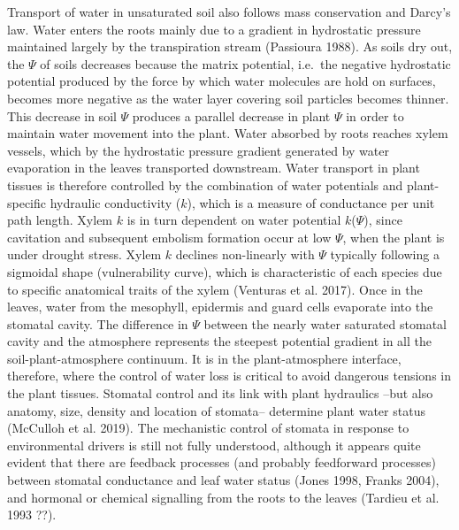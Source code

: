 \documentclass[11pt,twoside]{reedthesis}
\begin{document}
Transport of water in unsaturated soil also follows mass conservation
and Darcy's law. Water enters the roots mainly due to a gradient in
hydrostatic pressure maintained largely by the transpiration stream
(Passioura 1988). As soils dry out, the \(\Psi\) of soils decreases
because the matrix potential, i.e.~the negative hydrostatic potential
produced by the force by which water molecules are hold on surfaces,
becomes more negative as the water layer covering soil particles becomes
thinner. This decrease in soil \(\Psi\) produces a parallel decrease in
plant \(\Psi\) in order to maintain water movement into the plant. Water
absorbed by roots reaches xylem vessels, which by the hydrostatic
pressure gradient generated by water evaporation in the leaves
transported downstream. Water transport in plant tissues is therefore
controlled by the combination of water potentials and plant-specific
hydraulic conductivity (\(k\)), which is a measure of conductance per
unit path length. Xylem \(k\) is in turn dependent on water potential
\(k\)(\(\Psi\)), since cavitation and subsequent embolism formation
occur at low \(\Psi\), when the plant is under drought stress. Xylem
\(k\) declines non-linearly with \(\Psi\) typically following a
sigmoidal shape (vulnerability curve), which is characteristic of each
species due to specific anatomical traits of the xylem (Venturas et al.
2017). Once in the leaves, water from the mesophyll, epidermis and guard
cells evaporate into the stomatal cavity. The difference in \(\Psi\)
between the nearly water saturated stomatal cavity and the atmosphere
represents the steepest potential gradient in all the
soil-plant-atmosphere continuum. It is in the plant-atmosphere
interface, therefore, where the control of water loss is critical to
avoid dangerous tensions in the plant tissues. Stomatal control and its
link with plant hydraulics --but also anatomy, size, density and
location of stomata-- determine plant water status (McCulloh et al.
2019). The mechanistic control of stomata in response to environmental
drivers is still not fully understood, although it appears quite evident
that there are feedback processes (and probably feedforward processes)
between stomatal conductance and leaf water status (Jones 1998, Franks
2004), and hormonal or chemical signalling from the roots to the leaves
(Tardieu et al. 1993 ??).\par
\end{document}

